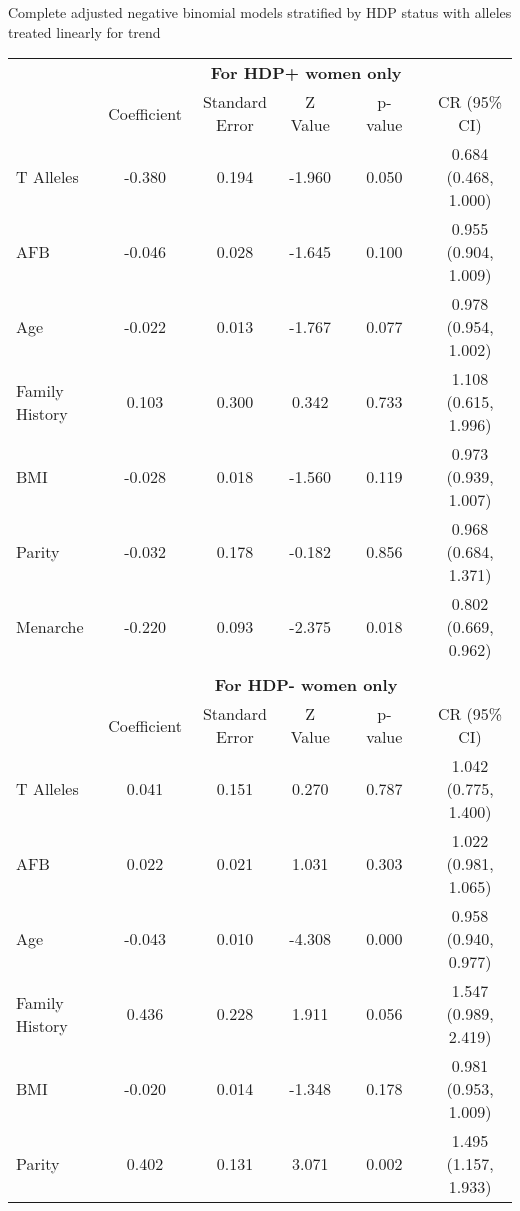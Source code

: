 \documentclass{standalone}
\begin{document}
\begin{threeparttable}
\caption{Complete adjusted negative binomial models stratified by HDP status with alleles treated linearly for trend}
\begin{tabular}{@{}lccccccc@{}}
  \toprule
& \multicolumn{7}{c}{\textbf{For HDP+ women only}} \\
   \cmidrule{2-8}
     & Coefficient & Standard Error & Z Value & \hspace{1em} & p-value & \hspace{1em} & CR (95\% CI) \\ 
  \midrule
  T Alleles\phantom{abcdefghijklm} & -0.380 & 0.194 & -1.960 && 0.050 && 0.684 (0.468, 1.000) \\ 
  AFB & -0.046 & 0.028 & -1.645 && 0.100 && 0.955 (0.904, 1.009) \\ 
  Age & -0.022 & 0.013 & -1.767 && 0.077 && 0.978 (0.954, 1.002) \\ 
  Family History & 0.103 & 0.300 & 0.342 && 0.733 && 1.108 (0.615, 1.996) \\ 
  BMI & -0.028 & 0.018 & -1.560 && 0.119 && 0.973 (0.939, 1.007) \\ 
  Parity & -0.032 & 0.178 & -0.182 && 0.856 && 0.968 (0.684, 1.371) \\ 
  Menarche & -0.220 & 0.093 & -2.375 && 0.018 && 0.802 (0.669, 0.962) \\
  \\
  & \multicolumn{7}{c}{\textbf{For HDP- women only}} \\
   \cmidrule{2-8}
     & Coefficient & Standard Error & Z Value & \hspace{1em} & p-value & \hspace{1em} & CR (95\% CI) \\ 
  \midrule
   T Alleles\phantom{abcdefghijklm} & 0.041 & 0.151 & 0.270 && 0.787 && 1.042 (0.775, 1.400) \\ 
  AFB & 0.022 & 0.021 & 1.031 && 0.303 && 1.022 (0.981, 1.065) \\ 
  Age & -0.043 & 0.010 & -4.308 && 0.000 && 0.958 (0.940, 0.977) \\ 
  Family History & 0.436 & 0.228 & 1.911 && 0.056 && 1.547 (0.989, 2.419) \\ 
  BMI & -0.020 & 0.014 & -1.348 && 0.178 && 0.981 (0.953, 1.009) \\ 
  Parity & 0.402 & 0.131 & 3.071 && 0.002 && 1.495 (1.157, 1.933) \\ 

\end{tabular}
\end{threeparttable}
\end{document}
